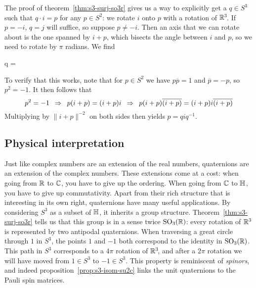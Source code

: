 The proof of theorem~\ref{thm:s3-surj-so3r} gives us a way to explicitly get
a $q \in S^3$ such that $q \cdot i = p$ for any $p \in S^2$:
we rotate $i$ onto $p$ with a rotation of $\R^3\!$.
If $p = -i$, $q = j$ will suffice,
so suppose $p \neq -i$.
Then an axis that we can rotate about is the one spanned by $i + p$,
which bisects the angle between $i$ and $p$,
so we need to rotate by $\pi$ radians.
We find
\begin{equationref}
\label{eqn:transitive-s3-action}
q = 
\end{equationref}
To verify that this works,
note that for $p \in S^2$ we have
$p \overline{p} = 1$ and $\overline{p} = -p$,
so $p^2 = -1$.
It then follows that
\[ p^2 = -1
\enskip \implies \enskip p(i + p) = (i + p)i
\enskip \implies \enskip p(i + p)\overline{(i + p)} = (i + p)i\overline{(i + p)} \]
Multiplying by $\|i + p\|^{-2}$ on both sides then yields $p = q i q^{-1}$.

\subsection*{Physical interpretation}
Just like complex numbers are an extension of the real numbers,
quaternions are an extension of the complex numbers.
These extensions come at a cost:
when going from $\R$ to $\C$, you have to give up the ordering.
When going from $\C$ to $\H$, you have to give up commutativity.
Apart from their rich structure that is interesting in its own right,
quaternions have many useful applications.
By considering $S^3$ as a subset of $\H$,
it inherits a group structure.
Theorem~\ref{thm:s3-surj-so3r} tells us that this group is in a sense
twice $\SOR$: every rotation of $\R^3$ is represented by two antipodal quaternions.
When traversing a great circle through $1$ in $S^3\!$,
the points $1$ and $-1$ both correspond to the identity in $\SOR$.
This path in $S^3$ corresponds to a $4\pi$ rotation of $\R^3\!$,
and after a $2\pi$ rotation we will have moved from $1 \in S^3$ to $-1 \in S^3\!$.
This property is reminiscent of \emph{spinors},
and indeed proposition~\ref{prop:s3-isom-su2c} links the unit quaternions to the Pauli spin matrices.
